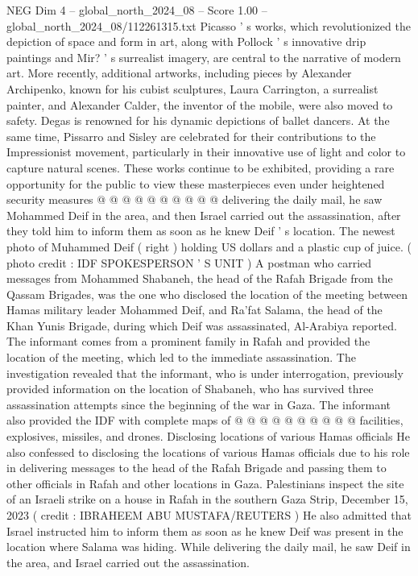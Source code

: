 \begin{textsample}{NEG Dim 4 – global\_north\_2024\_08 – Score 1.00 – global\_north\_2024\_08/112261315.txt}
Picasso ' s works, which revolutionized the depiction of space and form in art, along with Pollock ' s innovative drip paintings and Mir? ' s surrealist imagery, are central to the narrative of modern art.
More recently, additional artworks, including pieces by Alexander Archipenko, known for his cubist sculptures, Laura Carrington, a surrealist painter, and Alexander Calder, the inventor of the mobile, were also moved to safety.
Degas is renowned for his dynamic depictions of ballet dancers.
At the same time, Pissarro and Sisley are celebrated for their contributions to the Impressionist movement, particularly in their innovative use of light and color to capture natural scenes.
These works continue to be exhibited, providing a rare opportunity for the public to view these masterpieces even under heightened security measures @ @ @ @ @ @ @ @ @ @ delivering the daily mail, he saw Mohammed Deif in the area, and then Israel carried out the assassination, after they told him to inform them as soon as he knew Deif ' s location.
The newest photo of Muhammed Deif ( right ) holding US dollars and a plastic cup of juice. ( photo credit : IDF SPOKESPERSON ' S UNIT ) A postman who carried messages from Mohammed Shabaneh, the head of the Rafah Brigade from the Qassam Brigades, was the one who disclosed the location of the meeting between Hamas military leader Mohammed Deif, and Ra'fat Salama, the head of the Khan Yunis Brigade, during which Deif was assassinated, Al-Arabiya reported.
The informant comes from a prominent family in Rafah and provided the location of the meeting, which led to the immediate assassination.
The investigation revealed that the informant, who is under interrogation, previously provided information on the location of Shabaneh, who has survived three assassination attempts since the beginning of the war in Gaza.
The informant also provided the IDF with complete maps of @ @ @ @ @ @ @ @ @ @ facilities, explosives, missiles, and drones.
Disclosing locations of various Hamas officials He also confessed to disclosing the locations of various Hamas officials due to his role in delivering messages to the head of the Rafah Brigade and passing them to other officials in Rafah and other locations in Gaza.
Palestinians inspect the site of an Israeli strike on a house in Rafah in the southern Gaza Strip, December 15, 2023 ( credit : IBRAHEEM ABU MUSTAFA/REUTERS ) He also admitted that Israel instructed him to inform them as soon as he knew Deif was present in the location where Salama was hiding.
While delivering the daily mail, he saw Deif in the area, and Israel carried out the assassination.

\end{textsample}
